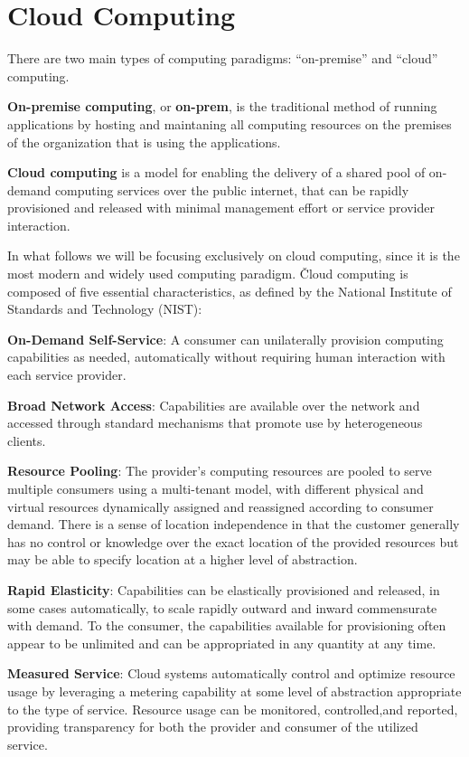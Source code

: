 \section{Cloud Computing}

There are two main types of computing paradigms: ``on-premise'' and ``cloud'' computing.

\textbf{On-premise computing}, or \textbf{on-prem}, is the traditional method of running applications by hosting and
maintaning all computing resources on the premises of the organization that is using the applications.
\ed

\textbf{Cloud computing} is a model for enabling the delivery of a shared pool of on-demand computing services over
the public internet, that can be rapidly provisioned and released with minimal management effort or service provider
interaction.
\ed

In what follows we will be focusing exclusively on cloud computing, since it is the most modern and widely used
computing paradigm. \v

Cloud computing is composed of five essential characteristics, as defined by the National Institute of Standards and
Technology (NIST):
\bit
\item \textbf{On-Demand Self-Service}: A consumer can unilaterally provision computing capabilities as needed,
automatically without requiring human interaction with each service provider.
\item \textbf{Broad Network Access}: Capabilities are available over the network and accessed through standard
mechanisms that promote use by heterogeneous clients.
\item \textbf{Resource Pooling}: The provider's computing resources are pooled to serve multiple consumers using a
multi-tenant model, with different physical and virtual resources dynamically assigned and reassigned according to
consumer demand. There is a sense of location independence in that the customer generally has no control or knowledge
over the exact location of the provided resources but may be able to specify location at a higher level of abstraction.
\item \textbf{Rapid Elasticity}: Capabilities can be elastically provisioned and released, in some cases automatically,
to scale rapidly outward and inward commensurate with demand. To the consumer, the capabilities available for
provisioning often appear to be unlimited and can be appropriated in any quantity at any time.
\item \textbf{Measured Service}: Cloud systems automatically control and optimize resource usage by leveraging a
metering capability at some level of abstraction appropriate to the type of service. Resource usage can be monitored,
controlled,and reported, providing transparency for both the provider and consumer of the utilized service.
\eit

